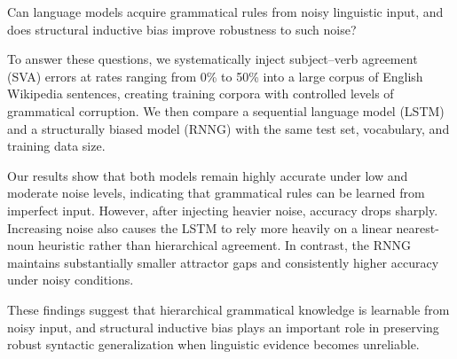 Can language models acquire grammatical rules from noisy linguistic input, and does structural inductive bias improve robustness to such noise?

To answer these questions, we systematically inject subject--verb agreement (SVA) errors at rates ranging from 0\% to 50\% into a large corpus of English Wikipedia sentences, creating training corpora with controlled levels of grammatical corruption. We then compare a sequential language model (LSTM) and a structurally biased model (RNNG) with the same test set, vocabulary, and training data size.

Our results show that both models remain highly accurate under low and moderate noise levels, indicating that grammatical rules can be learned from imperfect input. However, after injecting heavier noise, accuracy drops sharply. Increasing noise also causes the LSTM to rely more heavily on a linear nearest-noun heuristic rather than hierarchical agreement. In contrast, the RNNG maintains substantially smaller attractor gaps and consistently higher accuracy under noisy conditions.

These findings suggest that hierarchical grammatical knowledge is learnable from noisy input, and structural inductive bias plays an important role in preserving robust syntactic generalization when linguistic evidence becomes unreliable.
